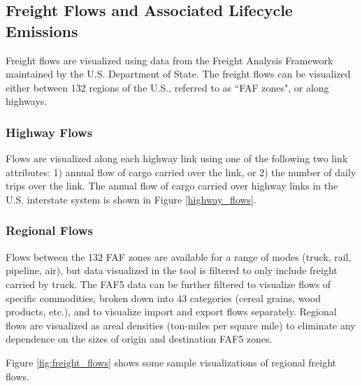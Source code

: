 \subsection{Freight Flows and Associated Lifecycle Emissions}

Freight flows are visualized using data from the Freight Analysis Framework \cite{faf5_2024} maintained by the U.S. Department of State. The freight flows can be visualized either between 132 regions of the U.S., referred to as ``FAF zones", or along highways. 

\subsubsection{Highway Flows}
Flows are visualized along each highway link using one of the following two link attributes: 1) annual flow of cargo carried over the link, or 2) the number of daily trips over the link. The annual flow of cargo carried over highway links in the U.S. interstate system is shown in Figure \ref{highway_flows}.

\subsubsection{Regional Flows}
Flows between the 132 FAF zones are available for a range of modes (truck, rail, pipeline, air), but data visualized in the tool is filtered to only include freight carried by truck. The FAF5 data can be further filtered to visualize flows of specific commodities, broken down into 43 categories (cereal grains, wood products, etc.), and to visualize import and export flows separately. Regional  flows are visualized as areal densities (ton-miles per square mile) to eliminate any dependence on the sizes of origin and destination FAF5 zones. 

Figure \ref{fig:freight_flows} shows some sample visualizations of regional freight flows. 

